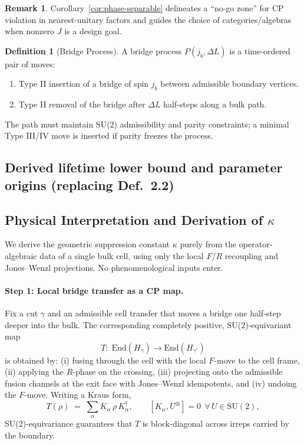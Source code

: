\documentclass[11pt]{article}
\newcommand{\End}{\mathrm{End}}
\theoremstyle{plain}
\theoremstyle{definition}
\newtheorem{definition}[theorem]{Definition}
\newtheorem{remark}[theorem]{Remark}
\begin{document}
\begin{remark}
  Corollary~\ref{cor:phase-separable} delineates a ``no-go zone'' for CP violation in nearest-unitary factors and guides the choice of categories/algebras when nonzero $J$ is a design goal.
\end{remark}

\begin{definition}[Bridge Process]
  A bridge process $P(j_b, \Delta L)$ is a time-ordered pair of moves:
  \begin{enumerate}
    \item Type II insertion of a bridge of spin $j_b$ between admissible boundary vertices.
    \item Type II removal of the bridge after $\Delta L$ half-steps along a bulk path.
  \end{enumerate}
  The path must maintain SU(2) admissibility and parity constraints; a minimal Type III/IV move is inserted if parity freezes the process.
\end{definition}

\subsection*{Derived lifetime lower bound and parameter origins (replacing Def.~2.2)}

\subsection{Physical Interpretation and Derivation of $\kappa$}
\label{sec:kappa-phys}

We derive the geometric suppression constant $\kappa$ purely from the operator-algebraic data of a single bulk cell, using only the local $F$/$R$ recoupling and Jones--Wenzl projections. No phenomenological inputs enter.

\paragraph{Step 1: Local bridge transfer as a CP map.}
Fix a cut $\gamma$ and an admissible cell transfer that moves a bridge one half-step deeper into the bulk. The corresponding completely positive, SU(2)-equivariant map
\[
  T: \; \End(H_\gamma) \to \End(H_{\gamma'})
\]
is obtained by: (i) fusing through the cell with the local $F$-move to the cell frame, (ii) applying the $R$-phase on the crossing, (iii) projecting onto the admissible fusion channels at the exit face with Jones--Wenzl idempotents, and (iv) undoing the $F$-move. Writing a Kraus form,
\[
  T(\rho)\;=\;\sum_{\alpha} K_\alpha \,\rho\, K_\alpha^\dagger,
  \qquad [K_\alpha, U^{\otimes}] = 0 \ \ \forall\,U\in \mathrm{SU}(2),
\]
SU(2)-equivariance guarantees that $T$ is block-diagonal across irreps carried by the boundary.
\end{document}
